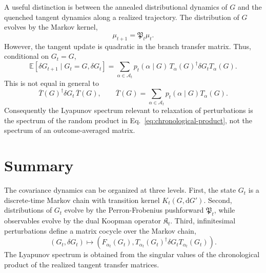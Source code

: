 \documentclass[aps,preprint,onecolumn,nofootinbib,superscriptaddress]{revtex4-2}
\newcommand{\E}{\mathbb{E}}
\newcommand{\dd}{\mathrm{d}}
\newcommand{\cA}{\mathcal{A}}
\newcommand{\PF}{\mathfrak{P}}
\newcommand{\Koop}{\mathfrak{K}}
\theoremstyle{definition}
\theoremstyle{plain}
\begin{document}
A useful distinction is between the annealed distributional dynamics of \(G\)
and the quenched tangent dynamics along a realized trajectory. The distribution
of \(G\) evolves by the Markov kernel,
\begin{equation}
  \mu_{t+1}=\PF_t\mu_t.
\end{equation}
However, the tangent update is quadratic in the branch transfer matrix. Thus,
conditional on \(G_t=G\),
\begin{equation}
  \E[\delta G_{t+1}\mid G_t=G,\delta G_t]
  =
  \sum_{\alpha\in\cA_t}
  p_t(\alpha\mid G)\,
  T_\alpha(G)^\dagger
  \delta G_t
  T_\alpha(G).
  \label{eq:average-quadratic}
\end{equation}
This is not equal in general to
\begin{equation}
  \overline T(G)^\dagger\delta G_t\,\overline T(G),
  \qquad
  \overline T(G)=
  \sum_{\alpha\in\cA_t}p_t(\alpha\mid G)T_\alpha(G).
\end{equation}
Consequently the Lyapunov spectrum relevant to relaxation of perturbations is
the spectrum of the random product in Eq.~\eqref{eq:chronological-product}, not
the spectrum of an outcome-averaged matrix.

\section{Summary}

The covariance dynamics can be organized at three levels.
First, the state \(G_t\) is a discrete-time Markov chain with transition kernel
\(K_t(G,\dd G')\). Second, distributions of \(G_t\) evolve by the
Perron-Frobenius pushforward \(\PF_t\), while observables evolve by the dual
Koopman operator \(\Koop_t\). Third, infinitesimal perturbations define a
matrix cocycle over the Markov chain,
\begin{equation}
  (G_t,\delta G_t)
  \mapsto
  \left(F_{\alpha_t}(G_t),
  T_{\alpha_t}(G_t)^\dagger\delta G_tT_{\alpha_t}(G_t)\right).
\end{equation}
The Lyapunov spectrum is obtained from the singular values of the chronological
product of the realized tangent transfer matrices.
\end{document}
